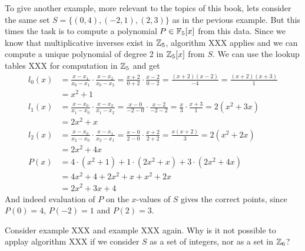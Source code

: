 \begin{example} To give another example, more relevant to the topics of this book, lets consider the same set $S=\{(0,4),(-2,1),(2,3)\}$ as in the pevious example. But this times the task is to compute a polynomial $P\in\mathbb{F}_5[x]$ from this data. Since we know
that multiplicative inverses exist in $\mathbb{Z}_5$, algorithm XXX applies and we can compute a unique polynomial of degree 2 in $\mathbb{Z}_5[x]$ from $S$. We can use the lookup tables XXX for computation in $\mathbb{Z}_5$ and get
\begin{align*}
l_0(x) & = \frac{x-x_1}{x_0-x_1}\cdot\frac{x-x_2}{x_0-x_2}
         = \frac{x+2}{0+2}\cdot\frac{x-2}{0-2}
         =  \frac{(x+2)(x-2)}{-4}
         =  \frac{(x+2)(x+3)}{1}\\
       & =  x^2+1\\
l_1(x) & =  \frac{x-x_0}{x_1-x_0}\cdot\frac{x-x_2}{x_1-x_2}
         = \frac{x-0}{-2-0}\cdot \frac{x-2}{-2-2}
         = \frac{x}{3}\cdot \frac{x+3}{1}
         = 2(x^2+3x)\\
       & =  2x^2+x\\
l_2(x) & = \frac{x-x_0}{x_2-x_0}\cdot\frac{x-x_1}{x_2-x_1}
         = \frac{x-0}{2-0}\cdot\frac{x+2}{2+2}
         = \frac{x(x+2)}{3}
         = 2(x^2+2x)\\
       & = 2x^2+4x\\
P(x)   & = 4\cdot (x^2+1) + 1\cdot (2x^2+x) + 3\cdot (2x^2+4x) \\
       & = 4x^2+4 + 2x^2 +x + x^2+2x\\
       & = 2x^2 +3x +4       
\end{align*}
And indeed evaluation of $P$ on the $x$-values of $S$ gives the correct points, since $P(0)=4$, $P(-2)=1$ and $P(2)=3$.
\end{example}

\begin{exercise}
Consider example XXX and example XXX again. Why is it not possible to applay algorithm XXX if we consider $S$ as a set of integers, nor as a set in $\mathbb{Z}_6$?
\end{exercise}



